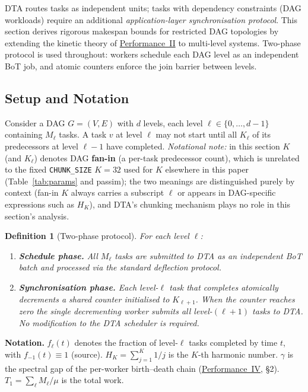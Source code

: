 \documentclass[11pt,a4paper]{report}
\newtheorem{definition}{Definition}[section]
\newcommand{\code}[1]{\texttt{#1}}
\begin{document}
DTA routes tasks as independent units; tasks with dependency constraints
(DAG workloads) require an additional \emph{application-layer synchronisation
protocol}.  This section derives rigorous makespan bounds for restricted DAG
topologies by extending the kinetic theory of
\hyperref[chap:kinetic_theory]{Performance~II} to multi-level systems.
Two-phase protocol is used throughout: workers schedule each DAG level as
an independent BoT job, and atomic counters enforce the join barrier between
levels.

\subsection{Setup and Notation}

Consider a DAG $G=(V,E)$ with $d$ levels, each level $\ell \in \{0,\ldots,d-1\}$
containing $M_\ell$ tasks.  A task $v$ at level $\ell$ may not start until
all $K_\ell$ of its predecessors at level $\ell-1$ have completed.
\emph{Notational note:} in this section $K$ (and $K_\ell$) denotes DAG
\textbf{fan-in} (a per-task predecessor count), which is unrelated to
the fixed \code{CHUNK\_SIZE} $K=32$ used for $K$ elsewhere in this paper
(Table~\ref{tab:params} and passim); the two meanings are
distinguished purely by context (fan-in $K$ always carries a subscript
$\ell$ or appears in DAG-specific expressions such as $H_K$), and DTA's
chunking mechanism plays no role in this section's analysis.

\begin{definition}[Two-phase protocol]
\label{def:two_phase}
For each level $\ell$:
\begin{enumerate}
  \item \textbf{Schedule phase.} All $M_\ell$ tasks are submitted to DTA
        as an independent BoT batch and processed via the standard
        deflection protocol.
  \item \textbf{Synchronisation phase.} Each level-$\ell$ task that
        completes atomically decrements a shared counter initialised
        to $K_{\ell+1}$.  When the counter reaches zero the single
        decrementing worker submits all level-$(\ell{+}1)$ tasks to DTA.
        No modification to the DTA scheduler is required.
\end{enumerate}
\end{definition}

\textbf{Notation.}
$f_\ell(t)$ denotes the fraction of level-$\ell$ tasks completed by time $t$,
with $f_{-1}(t) \equiv 1$ (source).
$H_K = \sum_{j=1}^K 1/j$ is the $K$-th harmonic number.
$\gamma$ is the spectral gap of the per-worker birth--death chain
(\hyperref[chap:stability]{Performance~IV}, \S{}2).
$T_1 = \sum_\ell M_\ell/\mu$ is the total work.
\end{document}
